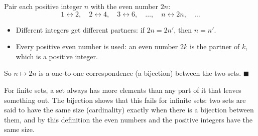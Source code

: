 Pair each positive integer $n$ with the even number $2n$:
\[
1\leftrightarrow2,\quad 2\leftrightarrow4,\quad 3\leftrightarrow6,\quad\dots,\quad n\leftrightarrow2n,\quad\dots
\]
\begin{itemize}
\item Different integers get different partners: if $2n=2n'$, then $n=n'$.
\item Every positive even number is used: an even number $2k$ is the partner of $k$, which is a positive integer.
\end{itemize}
So $n\mapsto2n$ is a one-to-one correspondence (a bijection) between the two sets. $\blacksquare$

For finite sets, a set always has more elements than any part of it that leaves something out. The bijection shows that this fails for infinite sets: two sets are said to have the same size (cardinality) exactly when there is a bijection between them, and by this definition the even numbers and the positive integers have the same size.
